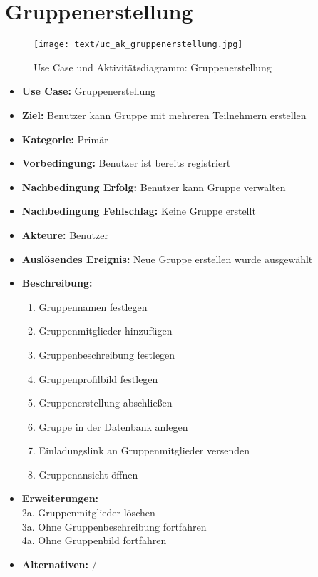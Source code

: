 \section{Gruppenerstellung}
\begin{figure}[h!]
	\centering
	\texttt{[image: text/uc\_ak\_gruppenerstellung.jpg]}
	\caption{Use Case und Aktivitätsdiagramm: Gruppenerstellung}
	\label{uc_ac_gruppenerstellung}
\end{figure}
\begin{itemize}
	\item \textbf{Use Case:} Gruppenerstellung
	\item \textbf{Ziel:} Benutzer kann Gruppe mit mehreren Teilnehmern erstellen
	\item \textbf{Kategorie:} Primär
	\item \textbf{Vorbedingung:} Benutzer ist bereits registriert
	\item \textbf{Nachbedingung Erfolg:} Benutzer kann Gruppe verwalten
	\item \textbf{Nachbedingung Fehlschlag:} Keine Gruppe erstellt
	\item \textbf{Akteure:} Benutzer
	\item \textbf{Auslösendes Ereignis:} \grqq Neue Gruppe erstellen\grqq{} wurde ausgewählt
	\item \textbf{Beschreibung:} \begin{enumerate}
		\item Gruppennamen festlegen
		\item Gruppenmitglieder hinzufügen
		\item Gruppenbeschreibung festlegen
		\item Gruppenprofilbild festlegen
		\item Gruppenerstellung abschließen
		\item Gruppe in der Datenbank anlegen
		\item Einladungslink an Gruppenmitglieder versenden
		\item Gruppenansicht öffnen
	\end{enumerate}
	\item \textbf{Erweiterungen:} \\2a. Gruppenmitglieder löschen\\
	3a. Ohne Gruppenbeschreibung fortfahren\\
	4a. Ohne Gruppenbild fortfahren
	\item \textbf{Alternativen:} /
\end{itemize}


